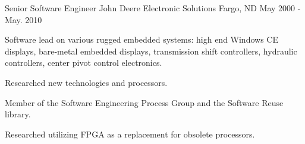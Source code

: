 \begin{cventries}
  \cventry
    {Senior Software Engineer} %
    {John Deere Electronic Solutions} %
    {Fargo, ND} %
    {May 2000 - May. 2010} %
    {
      \begin{cvitems} %
        \item {Software lead on various rugged embedded systems: high end Windows CE displays, bare-metal embedded displays, transmission shift controllers, hydraulic controllers, center pivot control electronics.}
        \item {Researched new technologies and processors.}
        \item {Member of the Software Engineering Process Group and the Software Reuse library.}
        \item {Researched utilizing FPGA as a replacement for obsolete processors.}
      \end{cvitems}
    }

\end{cventries}
